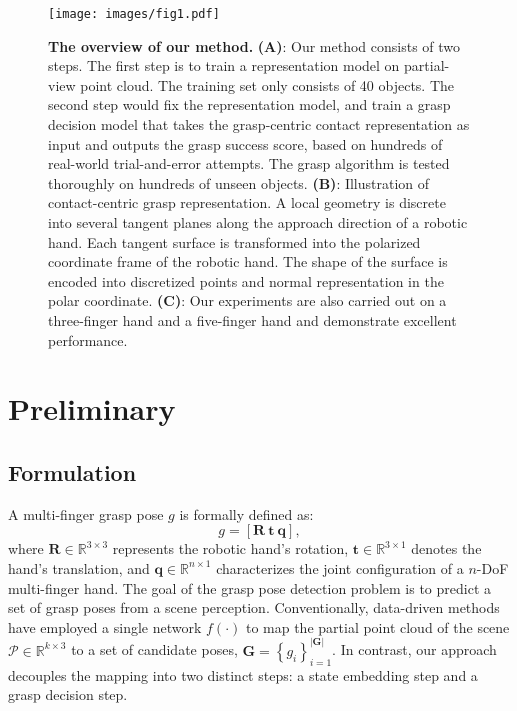 

\begin{figure}[htbp]
    \centering
    \texttt{[image: images/fig1.pdf]}
    \caption{\textbf{The overview of our method.} \textbf{(A)}: Our method consists of two steps. The first step is to train a representation model on partial-view point cloud. The training set only consists of 40 objects. The second step would fix the representation model, and train a grasp decision model that takes the grasp-centric contact representation as input and outputs the grasp success score, based on hundreds of real-world trial-and-error attempts. The grasp algorithm is tested thoroughly on hundreds of unseen objects. \textbf{(B)}: Illustration of contact-centric grasp representation. A local geometry is discrete into several tangent planes along the approach direction of a robotic hand. Each tangent surface is transformed into the polarized coordinate frame of the robotic hand. The shape of the surface is encoded into discretized points and normal representation in the polar coordinate. \textbf{(C)}: Our experiments are also carried out on a three-finger hand and a five-finger hand and demonstrate excellent performance.}
    \label{fig:teaser}
\end{figure}


\section{Preliminary}
\subsection{Formulation}

A multi-finger grasp pose $g$ is formally defined as:
\begin{equation}\label{multi-finger definition1}
    g = [\mathbf{R}\ \mathbf{t}\ \mathbf{q}],
\end{equation}
where $\mathbf{R} \in \mathbb{R}^{3\times3}$ represents the robotic hand's rotation, $\mathbf{t} \in \mathbb{R}^{3\times1}$ denotes the hand's translation, and $\mathbf{q} \in \mathbb{R}^{n\times1}$ characterizes the joint configuration of a $n$-DoF multi-finger hand. The goal of the grasp pose detection problem is to predict a set of grasp poses from a scene perception. Conventionally, data-driven methods have employed a single network $f(\cdot)$ to map the partial point cloud of the scene $\mathcal{P} \in \mathbb{R}^{k\times3}$ to a set of candidate poses, $\mathbf{G}=\left\{g_i\right\}_{i=1}^{|\mathbf{G}|}$. In contrast, our approach decouples the mapping into two distinct steps: a state embedding step and a grasp decision step.


